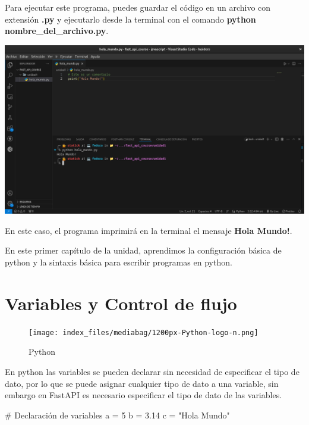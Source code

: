 \documentclass[
  a4paper,
  DIV=11,
  numbers=noendperiod,
  onepage,
  openany]{scrreprt}
\newenvironment{Shaded}{\begin{snugshade}}{\end{snugshade}}
\newcommand{\CommentTok}[1]{\textcolor[rgb]{0.37,0.37,0.37}{#1}}
\newcommand{\DecValTok}[1]{\textcolor[rgb]{0.68,0.00,0.00}{#1}}
\newcommand{\FloatTok}[1]{\textcolor[rgb]{0.68,0.00,0.00}{#1}}
\newcommand{\NormalTok}[1]{\textcolor[rgb]{0.00,0.23,0.31}{#1}}
\newcommand{\OperatorTok}[1]{\textcolor[rgb]{0.37,0.37,0.37}{#1}}
\newcommand{\StringTok}[1]{\textcolor[rgb]{0.13,0.47,0.30}{#1}}
\begin{document}
Para ejecutar este programa, puedes guardar el código en un archivo con
extensión \textbf{.py} y ejecutarlo desde la terminal con el comando
\textbf{python nombre\_del\_archivo.py}.

\includegraphics{unidades/unidad1/images/paste-2.png}

En este caso, el programa imprimirá en la terminal el mensaje
\textbf{Hola Mundo!}.

En este primer capítulo de la unidad, aprendimos la configuración básica
de python y la sintaxis básica para escribir programas en python.

\chapter{Variables y Control de
flujo}\label{variables-y-control-de-flujo}

\begin{figure}[H]

{\centering \texttt{[image: index\_files/mediabag/1200px-Python-logo-n.png]}

}

\caption{Python}

\end{figure}%

En python las variables se pueden declarar sin necesidad de especificar
el tipo de dato, por lo que se puede asignar cualquier tipo de dato a
una variable, sin embargo en FastAPI es necesario especificar el tipo de
dato de las variables.

\begin{Shaded}
\begin{Highlighting}[]
\CommentTok{\# Declaración de variables}
\NormalTok{a }\OperatorTok{=} \DecValTok{5}
\NormalTok{b }\OperatorTok{=} \FloatTok{3.14}
\NormalTok{c }\OperatorTok{=} \StringTok{"Hola Mundo"}
\end{Highlighting}
\end{Shaded}
\end{document}
